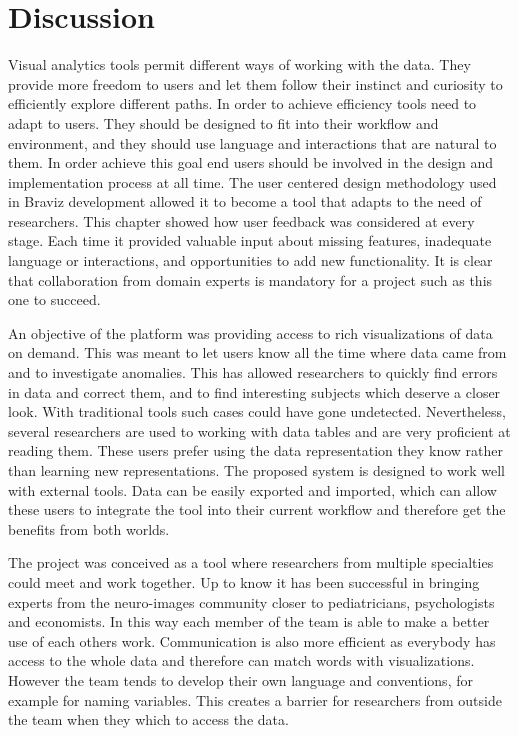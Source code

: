


\section{Discussion}

Visual analytics tools permit different ways of working with the data. They provide more freedom to users and let them follow their instinct and curiosity to efficiently explore different paths. In order to achieve efficiency tools need to adapt to users. They should be designed to fit into their workflow and environment, and they should use language and interactions that are natural to them. In order achieve this goal end users should be involved in the design and implementation process at all time. The user centered design methodology used in Braviz development allowed it to become a tool that adapts to the need of researchers. This chapter showed how user feedback was considered at every stage. Each time it provided valuable input about missing features, inadequate language or interactions, and opportunities to add new functionality. It is clear that collaboration from domain experts is mandatory for a project such as this one to succeed.

An objective of the platform was providing access to rich visualizations of data on demand. This was meant to let users know all the time where data came from and to investigate anomalies. This has allowed researchers to quickly find errors in data and correct them, and to find interesting subjects which deserve a closer look. With traditional tools such cases could have gone undetected. Nevertheless, several researchers are used to working with data tables and are very proficient at reading them. These users prefer using the data representation they know rather than learning new representations. The proposed system is designed to work well with external tools. Data can be easily exported and imported, which can allow these users to integrate the tool into their current workflow and therefore get the benefits from both worlds.

The project was conceived as a tool where researchers from multiple specialties could meet and work together. Up to know it has been successful in bringing experts from the neuro-images community closer to pediatricians, psychologists and economists. In this way each member of the team is able to make a better use of each others work. Communication is also more efficient as everybody has access to the whole data and therefore can match words with visualizations. However the team tends to develop their own language and conventions, for example for naming variables. This creates a barrier for researchers from outside the team when they which to access the data. 

